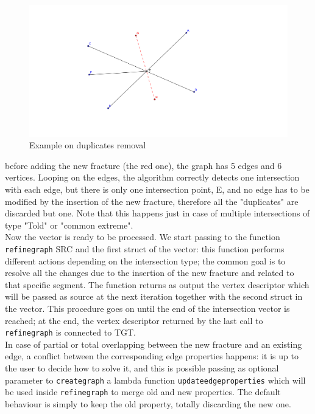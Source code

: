 \documentclass[11pt]{article} %
\begin{document}
		\begin{figure}
		\centering 
		\includegraphics[width=1\textwidth]{rem_dupl}
		\caption{Example on duplicates removal}
		\label{fig:rem_dupl}
		\end{figure}
		before adding the new fracture (the red one), the graph has 5 edges and 6 vertices. Looping on the edges, the algorithm correctly detects one intersection with each edge, but there is only one intersection point, E, and no edge has to be modified by the insertion of the new fracture, therefore all the "duplicates" are discarded but one. Note that this happens just in case of multiple intersections of type "Told" or "common extreme". \\
		Now the vector is ready to be processed. We start passing to the function \texttt{refine\textunderscore graph} SRC and the first struct of the vector: this function performs different actions depending on the intersection type; the common goal is to resolve all the changes due to the insertion of the new fracture and related to that specific segment. The function returns as output the vertex descriptor which will be passed as source at the next iteration together with the second struct in the vector. This procedure goes on until the end of the intersection vector is reached; at the end, the vertex descriptor returned by the last call to \texttt{refine\textunderscore graph} is connected to TGT. \\
		In case of partial or total overlapping between the new fracture and an existing edge, a conflict between the corresponding edge properties happens: it is up to the user to decide how to solve it, and this is possible passing as optional parameter to \texttt{create\textunderscore graph} a lambda function \texttt{update\textunderscore edge\textunderscore properties} which will be used inside \texttt{refine\textunderscore graph} to merge old and new properties. The default behaviour is simply to keep the old property, totally discarding the new one.
		
\end{document}
